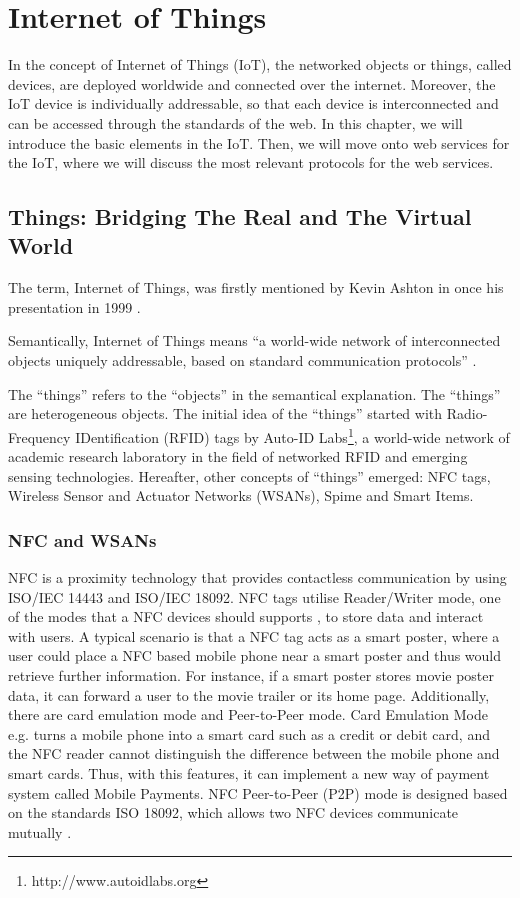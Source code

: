 \chapter{Internet of Things}
\label{chapter:internetofthings} 

In the concept of Internet of Things (IoT), the networked objects or things, called devices, are deployed worldwide and connected over the internet. Moreover, the IoT device is individually addressable, so that each device is interconnected and can be accessed through the standards of the web. In this chapter, we will introduce the basic elements in the IoT. Then, we will move onto web services for the IoT, where we will discuss the most relevant protocols for the web services.

\section{Things: Bridging The Real and The Virtual World}

The term, Internet of Things, was firstly mentioned by Kevin Ashton in once his presentation in 1999 \cite{ashton2009internet}.

Semantically, Internet of Things means ``a world-wide network of interconnected objects uniquely addressable, based on standard communication protocols'' \cite{infso2008networked}. 

The ``things'' refers to the ``objects'' in the semantical explanation. The ``things'' are heterogeneous objects. The initial idea of the ``things'' started with Radio-Frequency IDentification (RFID) tags by Auto-ID Labs\footnote{http://www.autoidlabs.org}, a world-wide network of academic research laboratory in the field of networked RFID and emerging sensing technologies. Hereafter, other concepts of ``things'' emerged: NFC tags, Wireless Sensor and Actuator Networks (WSANs), Spime and Smart Items.

\subsection{NFC and WSANs}

NFC is a proximity technology that provides contactless communication by using ISO/IEC 14443 and ISO/IEC 18092. NFC tags utilise Reader/Writer mode, one of the modes that a NFC devices should supports \cite{Madlmayr:SecurityandPrivacy}, to store data and interact with users. A typical scenario is that a NFC tag acts as a smart poster, where a user could place a NFC based mobile phone near a smart poster and thus would retrieve further information. For instance, if a smart poster stores movie poster data, it can forward a user to the movie trailer or its home page. Additionally, there are card emulation mode and Peer-to-Peer mode. Card Emulation Mode e.g. turns a mobile phone into a smart card such as a credit or debit card, and the NFC reader cannot distinguish the difference between the mobile phone and smart cards. Thus, with this features, it can implement a new way of payment system called Mobile Payments. NFC Peer-to-Peer (P2P) mode is designed based on the standards ISO 18092, which allows two NFC devices communicate mutually \cite{Madlmayr:SecurityandPrivacy}.

